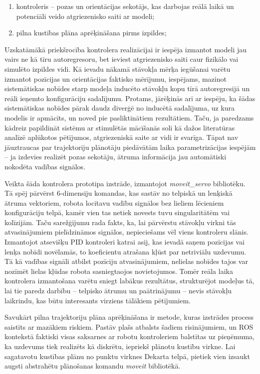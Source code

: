 \documentclass[12pt, a4paper]{article}
\numberwithin{equation}{section} %
\begin{document}
\begin{enumerate}
    \item kontroleris -- pozas un orientācijas sekotājs, kas darbojas reālā laikā un potenciāli veido atgriezenisko saiti ar modeli;
    \item pilna kustības plāna aprēķināšana pirms izpildes;
\end{enumerate}

Uzskatāmākā priekšrocība kontrolera realizācijai ir iespēja izmantot modeli jau vairs ne kā tīru autoregresoru, bet ieviest atgriezenisko saiti caur fizikālo vai simulēto izpildes vidi. Kā ievadu nākamā stāvokļa mērķa iegūšanai varētu izmantot pozīcijas un orientācijas faktisko mērījumu, iespējams, mazinot sistemātiskas nobīdes starp modeļa inducēto stāvokļu kopu tīrā autoregresijā un reāli ieņemto konfigurāciju sadalījumu. Protams, jārēķinās arī ar iespēju, ka šādas sistemātiskas nobīdes pārak daudz diverģē no inducētā sadalījuma, uz kura modelis ir apmācīts, un noved pie pasliktinātiem rezultātiem. Taču, ja paredzams kādreiz papildināt sistēmu ar stimulētās mācīšanās soli kā dažos literatūras analīzē aplūkotos pētījumos, atgriezeniskā saite ar vidi ir svarīga. Tāpat nav jāuztraucas par trajektoriju plānotāju piedāvātām laika parametrizācijas iespējām -- ja izdevies realizēt pozas sekotāju, ātruma informācija jau automātiski nokodēta vadības signālos.

Veikta šāda kontrolera prototipa izstrāde, izmantojot \textit{moveit\_servo} bibliotēku. Tā spēj pārvērst 6-dimensiju komandas, kas sastāv no telpiskā un lenķiskā ātruma vektoriem, robota locītavu vadību signālos bez lieliem lēcieniem konfigurāciju telpā, kamēr vien tas netiek novests tuvu singularitātēm vai kolīzijām. Taču sarežģījumu rada fakts, ka, lai pārvērstu stāvokļu virkni tās atvasinājumiem pielīdzināmos signālos, nepieciešams vēl viens kontroleru slānis. Izmantojot atsevišķu PID kontroleri katrai asij, kas ievadā saņem pozīcijas vai lenķa nobīdi novēlamās, to koeficientu atrašana kļūst par netriviālu uzdevumu. Tā kā vadības signāli atbilst pozīciju atvasinājumiem, nelielas nobīdes tajos var nozīmēt lielas kļūdas robota sasniegtaojos novietojumos. Tomēr reāla laika kontrolera izmantošana varētu sniegt labākus rezultātus, strukturējot modeļus tā, lai tie paredz darbību -- telpisko ātrumu un paātrinājumu -- nevis stāvokļu laikrindu, kas būtu interesants virziens tālākiem pētījumiem.

Savukārt pilna trajektoriju plāna aprēķināšana ir metode, kuras izstrādes process saistīts ar mazākiem riskiem. Pastāv plašs atbalsts šadiem risinājumiem, un ROS kontekstā faktiski visas saksarnes ar robotu kontroleriem balstītas uz pieņēmuma, ka uzdevums tiek realizēts kā diskrētu, iepriekš plānotu kustību virkne. Lai sagatavotu kustības plānu no punktu virknes Dekarta telpā, pietiek vien izsaukt augsti abstrahētu plānošanas komandu \textit{moveit} bibliotēkā. 
\end{document}
